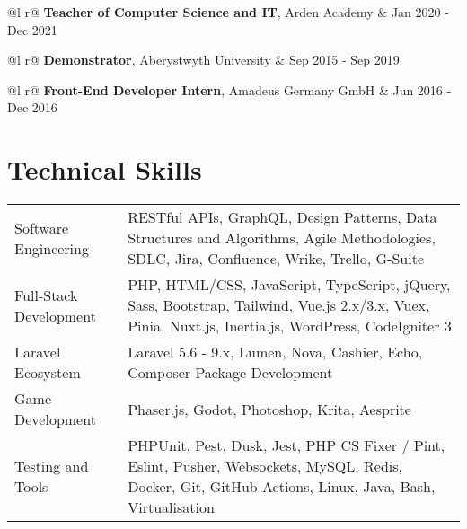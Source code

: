 \documentclass[a4paper,12pt]{article}
\begin{document}
\begin{tabularx}{\linewidth}{ @{}l r@{} }
\textbf{Teacher of Computer Science and IT}, Arden Academy & \hfill Jan 2020 - Dec 2021 \\[3.75pt]
\end{tabularx}

\begin{tabularx}{\linewidth}{ @{}l r@{} }
\textbf{Demonstrator}, Aberystwyth University & \hfill Sep 2015 - Sep 2019 \\[3.75pt]
\end{tabularx}

\begin{tabularx}{\linewidth}{ @{}l r@{} }
\textbf{Front-End Developer Intern}, Amadeus Germany GmbH & \hfill Jun 2016 - Dec 2016 \\[3.75pt]
\end{tabularx}

\section{Technical Skills}
\begin{tabularx}{\linewidth}{@{}l X@{}}
Software Engineering &  \normalsize{RESTful APIs, GraphQL, Design Patterns, Data Structures and Algorithms, Agile Methodologies, SDLC, Jira, Confluence, Wrike, Trello, G-Suite}\\
Full-Stack Development &  \normalsize{PHP, HTML/CSS, JavaScript, TypeScript, jQuery, Sass, Bootstrap, Tailwind, Vue.js 2.x/3.x, Vuex, Pinia, Nuxt.js, Inertia.js, WordPress, CodeIgniter 3}\\
Laravel Ecosystem &  \normalsize{Laravel 5.6 - 9.x, Lumen, Nova, Cashier, Echo, Composer Package Development}\\  
Game Development &  \normalsize{Phaser.js, Godot, Photoshop, Krita, Aesprite}\\ 
Testing and Tools &  \normalsize{PHPUnit, Pest, Dusk, Jest, PHP CS Fixer / Pint, Eslint, Pusher, Websockets, MySQL, Redis, Docker, Git, GitHub Actions, Linux, Java, Bash, Virtualisation}\\  
\end{tabularx}
\end{document}
